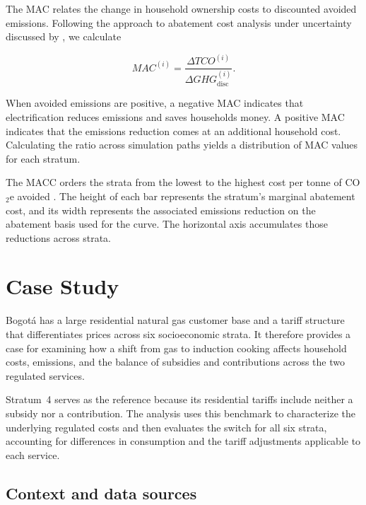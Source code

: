 \documentclass[authoryear,preprint,review,10pt]{elsarticle}
\begin{document}
The MAC relates the change in household ownership costs to discounted avoided emissions. Following the approach to abatement cost analysis under uncertainty discussed by \citet{clerc2013desarrollo}, we calculate

\begin{equation}
MAC^{(i)} =
\frac{\Delta TCO^{(i)}}{\Delta GHG_{\mathrm{disc}}^{(i)}}.
\end{equation}

When avoided emissions are positive, a negative MAC indicates that electrification reduces emissions and saves households money. A positive MAC indicates that the emissions reduction comes at an additional household cost. Calculating the ratio across simulation paths yields a distribution of MAC values for each stratum.

The MACC orders the strata from the lowest to the highest cost per tonne of CO$_2$e avoided \citep{clerc2013desarrollo}. The height of each bar represents the stratum's marginal abatement cost, and its width represents the associated emissions reduction on the abatement basis used for the curve. The horizontal axis accumulates those reductions across strata.

\section{Case Study}
\label{case study}

Bogotá has a large residential natural gas customer base and a tariff structure that differentiates prices across six socioeconomic strata. It therefore provides a case for examining how a shift from gas to induction cooking affects household costs, emissions, and the balance of subsidies and contributions across the two regulated services.

Stratum~4 serves as the reference because its residential tariffs include neither a subsidy nor a contribution. The analysis uses this benchmark to characterize the underlying regulated costs and then evaluates the switch for all six strata, accounting for differences in consumption and the tariff adjustments applicable to each service.

\subsection{Context and data sources}
\label{sec:context_data_sources}
\end{document}

